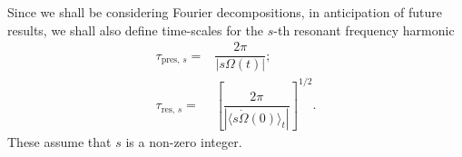 Since we shall be considering Fourier decompositions, in anticipation of future results, we shall also define time-scales for the $s$-th resonant frequency harmonic
\begin{align}
\tau_{\mathrm{pres},\,s} = {} & \dfrac{2\pi}{|s\Omega(t)|};\\
\tau_{\mathrm{res},\,s} = {} & \left[\dfrac{2\pi}{\left|\langle s\dot{\Omega}(0)\rangle_t\right|}\right]^{1/2}.
\end{align}
These assume that $s$ is a non-zero integer.